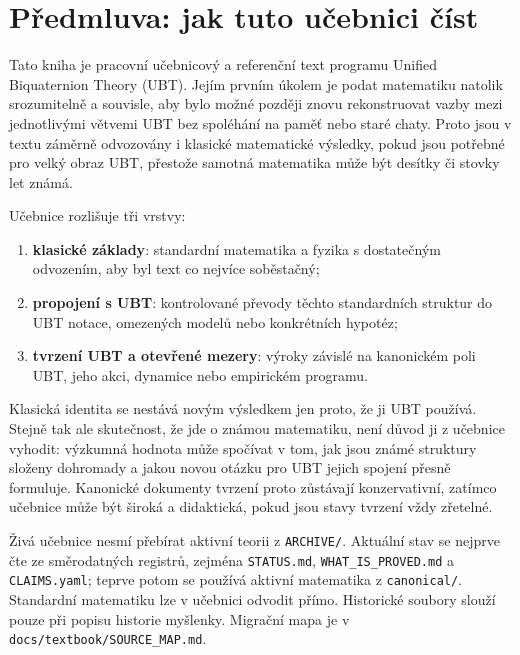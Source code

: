 
\chapter*{Předmluva: jak tuto učebnici číst}

Tato kniha je pracovní učebnicový a referenční text programu Unified
Biquaternion Theory (UBT). Jejím prvním úkolem je podat matematiku natolik
srozumitelně a souvisle, aby bylo možné později znovu rekonstruovat vazby mezi
jednotlivými větvemi UBT bez spoléhání na paměť nebo staré chaty. Proto jsou v
textu záměrně odvozovány i klasické matematické výsledky, pokud jsou potřebné
pro velký obraz UBT, přestože samotná matematika může být desítky či stovky let
známá.

Učebnice rozlišuje tři vrstvy:
\begin{enumerate}
  \item\textbf{klasické základy}: standardní matematika a fyzika s dostatečným
        odvozením, aby byl text co nejvíce soběstačný;
  \item\textbf{propojení s UBT}: kontrolované převody těchto standardních struktur
        do UBT notace, omezených modelů nebo konkrétních hypotéz;
  \item\textbf{tvrzení UBT a otevřené mezery}: výroky závislé na kanonickém poli
        UBT, jeho akci, dynamice nebo empirickém programu.
\end{enumerate}

Klasická identita se nestává novým výsledkem jen proto, že ji UBT používá.
Stejně tak ale skutečnost, že jde o známou matematiku, není důvod ji z učebnice
vyhodit: výzkumná hodnota může spočívat v tom, jak jsou známé struktury složeny
dohromady a jakou novou otázku pro UBT jejich spojení přesně formuluje.
Kanonické dokumenty tvrzení proto zůstávají konzervativní, zatímco učebnice může
být široká a didaktická, pokud jsou stavy tvrzení vždy zřetelné.

Živá učebnice nesmí přebírat aktivní teorii z \texttt{ARCHIVE/}. Aktuální
stav se nejprve čte ze směrodatných registrů, zejména \texttt{STATUS.md},
\texttt{WHAT\_IS\_PROVED.md} a \texttt{CLAIMS.yaml}; teprve potom se používá
aktivní matematika z \texttt{canonical/}. Standardní matematiku lze v učebnici
odvodit přímo. Historické soubory slouží pouze při popisu historie myšlenky.
Migrační mapa je v \texttt{docs/textbook/SOURCE\_MAP.md}.


